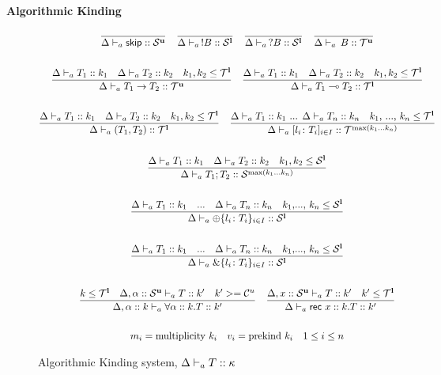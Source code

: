 \documentclass[12pt,openright,twoside]{report}
\begin{document}
	\begin{center}
		\textbf{Algorithmic Kinding}
	\end{center}

\begin{figure}[ht]
\centering
  \begin{gather*}
	\frac{}{\Delta \vdash_{a} \mathsf{skip} :: \mathcal S^{\mathbf{u}}} \quad
	\frac{}{\Delta \vdash_{a} \,!B :: \mathcal S^{\mathbf{l}}} \quad 
	\frac{}{\Delta \vdash_{a} \,?B :: \mathcal S^{\mathbf{l}}} \quad
	\frac{}{\Delta \vdash_{a} \,B :: \mathcal T^{\mathbf{u}}}	
    \\\\
    \frac{\Delta \vdash_{a} T_1 :: k_1 \quad \Delta \vdash_{a} T_2 :: k_2 \quad k_1, k_2 \le \mathcal T^{\mathbf{l}}}
    	{\Delta \vdash_{a} T_1 \to T_2 :: \mathcal T^{\mathbf{u}}}	
	\quad
    \frac{\Delta \vdash_{a} T_1 :: k_1 \quad \Delta \vdash_{a} T_2 :: k_2 \quad k_1, k_2 \le \mathcal T^{\mathbf{l}}}
    	{\Delta \vdash_{a} T_1 \multimap T_2 :: \mathcal T^{\mathbf{l}}}	
    \\\\
    \frac{\Delta \vdash_{a} T_1 :: k_1 \quad \Delta \vdash_{a} T_2 :: k_2 \quad k_1, k_2 \le \mathcal T^{\mathbf{l}}}
    	{\Delta \vdash_{a} (T_1,T_2) :: \mathcal T^{\mathbf{l}}}	
	\quad
    \frac{\Delta \vdash_{a} T_1 :: k_1 \mbox{ ... } \Delta \vdash_{a} T_n :: k_n \quad k_1\mbox{, ..., } k_n \le \mathcal T^{\mathbf{l}}}
    	{\Delta \vdash_{a} [l_i\colon T_i]_{i\in I} :: \mathcal T^{\max(k_1 ... k_n)}}	
	\\\\
	\frac{\Delta \vdash_{a} T_1 :: k_1 \quad \Delta \vdash_{a} T_2 :: k_2 \quad k_1, k_2 \le \mathcal S^{\mathbf{l}}}
    	{\Delta \vdash_{a} T_1;T_2 :: \mathcal S^{\max(k_1 ... k_n)}}	    
	\\\\
		\frac{\Delta \vdash_{a} T_1 :: k_1 \quad \mbox{...} \quad \Delta \vdash_{a} T_n :: k_n \quad k_1\mbox{,..., }k_n \le \mathcal S^{\mathbf{l}}}{
      \Delta \vdash_{a} \oplus\{l_i\colon T_i\}_{i\in I} :: \mathcal S^{\mathbf{l}}}
    \\\\
    \frac{\Delta \vdash_{a} T_1 :: k_1 \quad \mbox{...} \quad \Delta \vdash_{a} T_n :: k_n \quad k_1\mbox{,..., }k_n \le \mathcal S^{\mathbf{l}}}
    { \Delta \vdash_{a} \&\{l_i\colon T_i\}_{i\in I} :: \mathcal S^{\mathbf{l}}}
	\\\\
	 \frac{k \le \mathcal T^{\mathbf{l}} \quad \Delta, \alpha :: \mathcal S^{\mathbf{u}} \vdash_{a} T :: k' \quad k' >= \mathcal C^u}{\Delta, \alpha :: k \vdash_{a} \forall \alpha :: k.T :: k'}
	\quad
	\frac{\Delta, x :: \mathcal S^{\mathbf{u}} \vdash_{a} T :: k' \quad k' \le \mathcal T^{\mathbf{l}}}{\Delta \vdash_{a} \mathsf{rec} \mbox{ } x :: k.T :: k'}
	 \\\\
	m_i = \mbox{multiplicity } k_i \quad v_i = \mbox{prekind } k_i \quad 1 \le i \le n 
	\end{gather*}
  \caption{Algorithmic Kinding system, $\Delta \vdash_{a} T :: \kappa$}
  \label{fig:kinding}
\end{figure}
 
%



\end{document}
